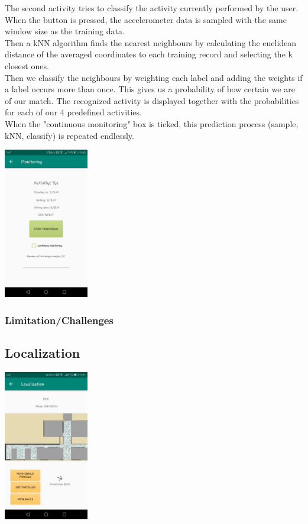 \documentclass[12pt]{article}
\begin{document}
The second activity tries to classify the activity currently performed by the user. When the button is pressed, the accelerometer data is sampled with the same window size as the training data. 
\\
Then a kNN algorithm finds the nearest neighbours by calculating the euclidean distance of the averaged coordinates to each training record and selecting the k closest ones. 
\\
Then we classify the neighbours by weighting each label and adding the weights if a label occurs more than once. This gives us a probability of how certain we are of our match. The recognized activity is displayed together with the probabilities for each of our 4 predefined activities.
\\
When the "continuous monitoring" box is ticked, this prediction process (sample, kNN, classify) is repeated endlessly.

\begin{center}
  \includegraphics[width=140px]{images/monitoring.jpeg}
\end{center}

\pagebreak

\subsubsection{Limitation/Challenges}


\subsection{Localization}

\begin{center}
	\includegraphics[width=140px]{images/localization}
\end{center}
\end{document}
